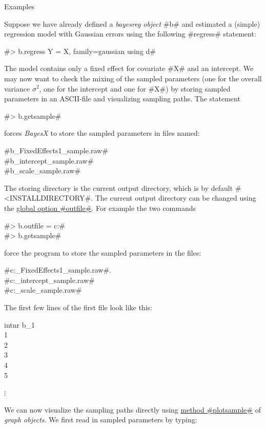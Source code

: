 \begin{stanza}{Examples}

Suppose we have already defined a {\em bayesreg object} #b# and
estimated a (simple) regression model with Gaussian errors using
the following #regress# statement:

#> b.regress Y = X, family=gaussian using d#

The model contains only a fixed effect for covariate #X# and an
intercept. We may now want to check the mixing of the sampled
parameters (one for the overall variance $\sigma^2$, one for the
intercept and one for #X#) by storing sampled parameters in an
ASCII-file and visualizing sampling paths. The statement

#> b.getsample#

forces {\em BayesX} to store the sampled parameters in files
named:

#b_FixedEffects1_sample.raw# \\
#b_intercept_sample.raw# \\
#b_scale_sample.raw#

The storing directory is the current output directory, which is by
default #<INSTALLDIRECTORY\output#. The current output directory
can be changed using the \hyperref[bayesregglobopt]{global option
#outfile#}. For example the two commands

#> b.outfile = c:\data{}# \\
#> b.getsample#

force the program  to store the sampled parameters in the files:

#c:\data{}_FixedEffects1_sample.raw#. \\
#c:\data{}_intercept_sample.raw# \\
#c:\data{}_scale_sample.raw#


The first few lines of the first file look like this:

intnr \quad b\_1  \\
1   \\
2   \\
3   \\
4   \\
5 

\hspace {1cm} $\vdots$

We can now visualize the sampling paths directly using
\hyperref[graphplotsample]{method #plotsample#} of {\em graph
objects}. We first read in sampled parameters by typing:


\end{stanza}
